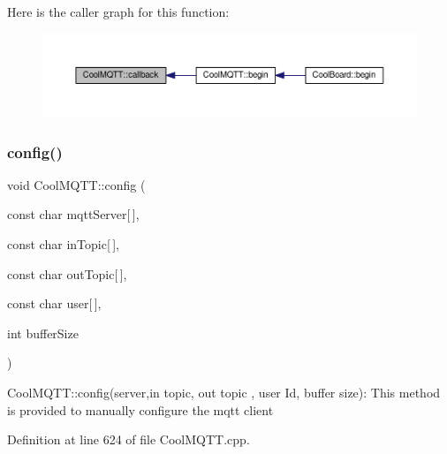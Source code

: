 Here is the caller graph for this function\+:\nopagebreak
\begin{figure}[H]
\begin{center}
\leavevmode
\includegraphics[width=350pt]{d0/dd0/class_cool_m_q_t_t_a30d82ad665bfb603f46ecdbc290775df_icgraph}
\end{center}
\end{figure}
\mbox{\label{class_cool_m_q_t_t_a9b703de4f1358f0ee7a5e8c44979c648}} 
\subsubsection{\texorpdfstring{config()}{config()}\hspace{0.1cm}{\footnotesize\ttfamily [1/2]}}
{\footnotesize\ttfamily void Cool\+M\+Q\+T\+T\+::config (\begin{DoxyParamCaption}\item[{const char}]{mqtt\+Server\mbox{[}$\,$\mbox{]},  }\item[{const char}]{in\+Topic\mbox{[}$\,$\mbox{]},  }\item[{const char}]{out\+Topic\mbox{[}$\,$\mbox{]},  }\item[{const char}]{user\mbox{[}$\,$\mbox{]},  }\item[{int}]{buffer\+Size }\end{DoxyParamCaption})}

Cool\+M\+Q\+T\+T\+::config(server,in topic, out topic , user Id, buffer size)\+: This method is provided to manually configure the mqtt client 

Definition at line 624 of file Cool\+M\+Q\+T\+T.\+cpp.


